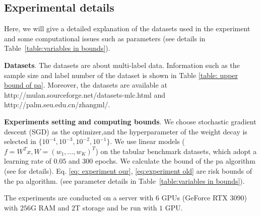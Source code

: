 \documentclass{article}
\newtheorem*{remark}{Remark}
\begin{document}
\subsection{Experimental details}
\label{section:expdetails}
Here, we will give a detailed explanation of the datasets used in the experiment and some computational issues such as parameters (see details in Table~\ref{table:variables in bounds}). 

\textbf{Datasets}. The datasets are about multi-label data. Information such as the sample size and label number of the dataset is shown in Table \ref{table: upper bound of pa}. Moreover, the datasets are available at http://mulan.sourceforge.net/datasets-mlc.html and http://palm.seu.edu.cn/zhangml/.

\textbf{Experiments setting and computing bounds}. We choose stochastic gradient descent (SGD) as the optimizer,and the hyperparameter of the weight decay is selected in $\{ 10^{-4},10^{-3},10^{-2},10^{-1} \}$. We use linear models ($f=W^Tx, W=(w_1,\dots,w_K)^T$) on the tabular benchmark datasets, which adopt a learning rate of $0.05$ and $300$ epochs. We calculate the bound of the pa algorithm (see \cite{wu2023macro-auc} for details). 
Eq. \eqref{eq: experiment our}, \eqref{eq:experiment old} are risk bounds of the pa algorithm. (see parameter details in Table~\ref{table:variables in bounds}).

The experiments are conducted on a server with $6$ GPUs (GeForce RTX 3090) with $256$G RAM and $2$T storage and be run with $1$ GPU.

\end{document}

